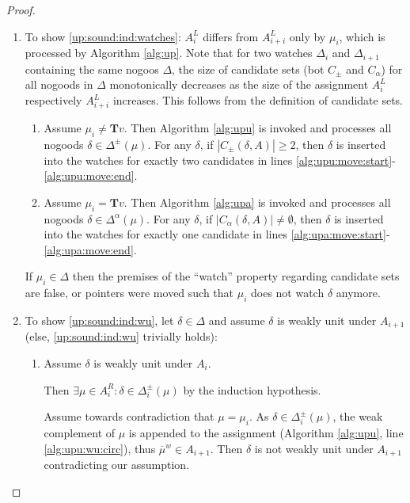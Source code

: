 \documentclass{vutinfth} %
\newcommand{\negweak}[1]{\overline{#1}^w}
\newcommand{\ass}{A}
\newcommand{\bT}{\mathbf{T}}
\newcommand{\cdpm}{C_\pm}
\newcommand{\cdal}{C_\alpha}
\newcommand{\dpm}{\Delta^\pm}
\newcommand{\dal}{\Delta^\alpha}
\newcommand{\sgl}{\mu}
\begin{document}
\begin{proof}
\begin{enumerate}
\item To show \ref{up:sound:ind:watches}: $A_i^L$ differs from $A_{i+i}^L$ only by $\sgl_i$, which is processed by Algorithm \ref{alg:up}. Note that for two watches $\Delta_{i}$ and $\Delta_{i+1}$ containing the same nogoos $\Delta$, the size of candidate sets (bot $\cdpm$ and $\cdal$) for all nogoods in $\Delta$ monotonically decreases as the size of the assignment $A_i^L$ respectively $A_{i+i}^L$ increases. This follows from the definition of candidate sets.
\begin{enumerate}
	\item Assume $\sgl_i \not = \bT v$. Then Algorithm \ref{alg:upu} is invoked and processes all nogoods $\delta \in \dpm(\sgl)$. For any $\delta$, if $|\cdpm(\delta, A)| \geq 2$, then $\delta$ is inserted into the watches for exactly two candidates in lines \ref{alg:upu:move:start}-\ref{alg:upu:move:end}.
	\item Assume $\sgl_i = \bT v$. Then Algorithm \ref{alg:upa} is invoked and processes all nogoods $\delta \in \dal(\sgl)$. For any $\delta$, if $|\cdal(\delta, A)| \not = \emptyset$, then $\delta$ is inserted into the watches for exactly one candidate in lines \ref{alg:upa:move:start}-\ref{alg:upa:move:end}. 
\end{enumerate}

If $\sgl_i \in \Delta$ then the premises of the \enquote{watch} property regarding candidate sets are false, or pointers were moved such that $\sgl_i$ does not watch $\delta$ anymore.

\item To show \ref{up:sound:ind:wu}, let $\delta \in \Delta$ and assume $\delta$ is weakly unit under $\ass_{i+1}$ (else, \ref{up:sound:ind:wu} trivially holds):
\begin{enumerate}
	\item Assume $\delta$ is weakly unit under $\ass_i$. \label{pr:corr:wu:wu}
	
	Then $\exists \sgl \in \ass_i^R : \delta \in \Delta_i^\pm(\sgl)$ by the induction hypothesis. 
	
	Assume towards contradiction that $\sgl = \sgl_i$. As $\delta \in \dpm_i(\sgl)$, the weak complement of $\sgl$ is appended to the assignment (Algorithm \ref{alg:upu}, line \ref{alg:upu:wu:circ}), thus $\negweak{\sgl} \in A_{i+1}$. Then $\delta$ is not weakly unit under $A_{i+1}$ contradicting our assumption.
	

\end{enumerate}
\end{enumerate}
\end{proof}
\end{document}
